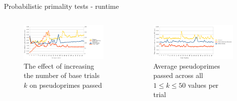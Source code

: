 \documentclass[pdf]{beamer}
\begin{document}
\begin{frame}{Probabilistic primality tests - runtime}
    \begin{columns}[t, onlytextwidth]
        \begin{column}{0.48\textwidth}
            \begin{figure}
                \setcounter{figure}{2}
                \caption{The effect of increasing the number of base trials $k$ on pseudoprimes passed}
                \centering
                \includegraphics[width=\textwidth]{time_v_bases}
            \end{figure}
        \end{column}
        \begin{column}{0.48\textwidth}
            \begin{figure}
                \setcounter{figure}{3}
                \caption{Average pseudoprimes passed across all $1 \leq k \leq 50$ values per trial}
                \centering
                \includegraphics[width=\textwidth]{time_v_trial}
            \end{figure}
        \end{column}
    \end{columns}
    \begin{outline}
    \end{outline}
\end{frame}
\end{document}
